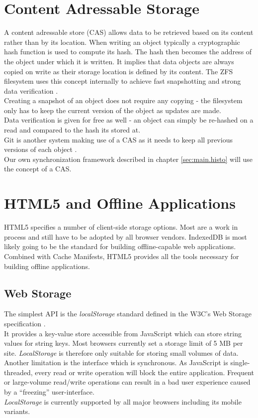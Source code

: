 \section{Content Adressable Storage}
A content adressable store (CAS) allows data to be retrieved based on its content rather than by its location.
When writing an object typically a cryptographic hash function is used to compute its hash.
The hash then becomes the address of the object under which it is written.
It implies that data objects are always copied on write as their storage location is defined by its content.
The ZFS filesystem uses this concept internally to achieve fast snapshotting and strong data verification \cite{strobl2008zfs}.\\
Creating a snapshot of an object does not require any copying - the filesystem only has to keep the current version of the object as updates are made.\\
Data verification is given for free as well - an object can simply be re-hashed on a read and compared to the hash its stored at.\\
Git is another system making use of a CAS as it needs to keep all previous versions of each object \cite{swicegood2008pragmatic}.\\
Our own synchronization framework described in chapter \ref{sec:main.histo} will use the concept of a CAS.

\section{HTML5 and Offline Applications}
HTML5 specifies a number of client-side storage options. Most are a work in process and still have to be adopted by all browser vendors. IndexedDB is most likely going to be the standard for building offline-capable web applications. Combined with Cache Manifests, HTML5 provides all the tools necessary for building offline applications.

\subsection{Web Storage}
The simplest API is the \emph{localStorage} standard defined in the W3C's Web Storage specification \cite{webstorage}.\\
It provides a key-value store accessible from JavaScript which can store string values for string keys.
Most browsers currently set a storage limit of 5 MB per site.
\emph{LocalStorage} is therefore only suitable for storing small volumes of data.\\
Another limitation is the interface which is synchronous. As JavaScript is single-threaded, every read or write operation will block the entire application.
Frequent or large-volume read/write operations can result in a bad user experience caused by a ``freezing'' user-interface.\\
\emph{LocalStorage} is currently supported by all major browsers including its mobile variants.

